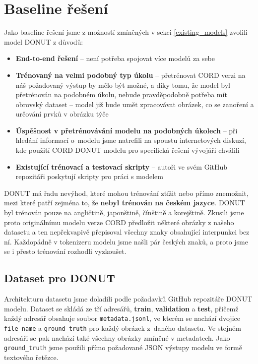 \documentclass{article}
\begin{document}
\section{Baseline řešení}

Jako baseline řešení jsme z možností zmíněných v sekci \ref{existing_models} zvolili model DONUT z důvodů:

\begin{itemize}
\item{\textbf{End-to-end řešení} -- není potřeba spojovat více modelů za sebe}
\item{\textbf{Trénovaný na velmi podobný typ úkolu} -- přetrénovat CORD verzi na náš požadovaný výstup by mělo být možné, a díky tomu, že model byl přetrénován na podobném úkolu, nebude pravděpodobně potřeba mít obrovský dataset -- model již bude umět zpracovávat obrázek, co se zanoření a určování prvků v obrázku týče}

\item{\textbf{Úspěšnost v přetrénovávání modelu na podobných úkolech} -- při hledání informací o~modelu jsme natrefili na spoustu internetových diskuzí, kde použití CORD DONUT modelu pro specifická řešení vývojáři chválili}

\item{\textbf{Existující trénovací a testovací skripty} -- autoři ve svém GitHub repozitáři poskytují skripty pro práci s modelem}
\end{itemize}

DONUT má řadu nevýhod, které mohou trénování ztížit nebo přímo znemožnit, mezi které patří zejména to, že \textbf{nebyl trénován na českém jazyce}. DONUT byl trénován pouze na angličtině, japonštině, čínštině a korejštině. Zkusili jsme proto originálnímu modelu verze CORD předložit některé obrázky z našeho datasetu a ten nepřekvapivě přepisoval všechny znaky obsahující interpunkci bez ní. Každopádně v tokenizeru modelu jsme našli pár českých znaků, a proto jsme se i přesto trénování rozhodli vyzkoušet.

\subsection{Dataset pro DONUT}

Architekturu datasetu jsme doladili podle požadavků GitHub repozitáře DONUT modelu. Dataset se skládá ze tří adresářů, \textbf{train}, \textbf{validation} a \textbf{test}, přičemž každý adresář obsahuje soubor \verb|metadata.jsonl|, ve kterém se nachází dvojice \verb|file_name| a \verb|ground_truth| pro každý obrázek z~daného datasetu. Ve stejném adresáři se pak nachází také všechny obrázky zmíněné v metadatech. Jako \verb|ground_truth| jsme použili přímo požadované JSON výstupy modelu ve formě textového řetězce.
\end{document}
